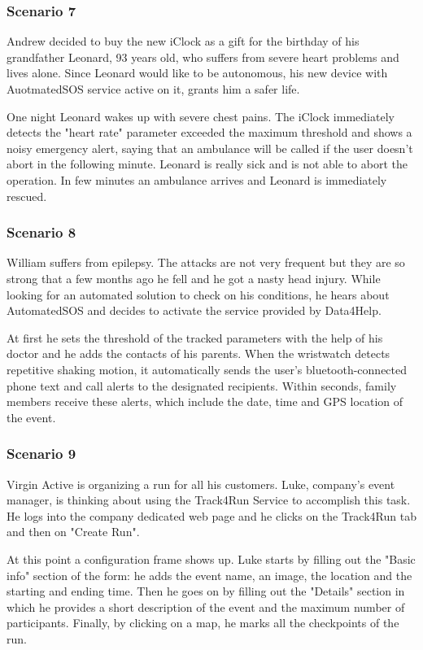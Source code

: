 \subsubsection{Scenario 7}
Andrew decided to buy the new iClock as a gift for the birthday of his grandfather Leonard, 93 years old, who suffers from severe heart problems and lives alone. Since Leonard would like to be autonomous, his new device with AuotmatedSOS service active on it, grants him a safer life.

One night Leonard wakes up with severe chest pains. The iClock immediately detects the "heart rate" parameter exceeded the maximum threshold and shows a noisy emergency alert, saying that an ambulance will be called if the user doesn't abort in the following minute. Leonard is really sick and is not able to abort the operation. In few minutes an ambulance arrives and Leonard is immediately rescued.
\subsubsection{Scenario 8}
William suffers from epilepsy. The attacks are not very frequent but they are so strong that a few months ago he fell and he got a nasty head injury. While looking for an automated solution to check on his conditions, he hears about AutomatedSOS and decides to activate the service provided by Data4Help.

At first he sets the threshold of the tracked parameters with the help of his doctor and he adds the contacts of his parents. When the wristwatch detects repetitive shaking motion, it automatically sends the user’s bluetooth-connected phone text and call alerts to the designated recipients. Within seconds, family members receive these alerts, which include the date, time and GPS location of the event.
\subsubsection{Scenario 9}
Virgin Active is organizing a run for all his customers. Luke, company's event manager, is thinking about using the Track4Run Service to accomplish this task. He logs into the company dedicated web page and he clicks on the Track4Run tab and then on "Create Run".

At this point a configuration frame shows up. Luke starts by filling out the "Basic info" section of the form: he adds the event name, an image, the location and the starting and ending time. Then he goes on by filling out the "Details" section in which he provides a short description of the event and the maximum number of participants. Finally, by clicking on a map, he marks all the checkpoints of the run.


